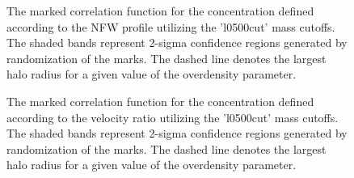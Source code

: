 \documentclass[usenatbib,usegraphicx,letterpaper]{mn2e}
\begin{document}
\begin{figure}
	\centering
	\caption{The marked correlation function for the concentration defined according to the NFW profile utilizing the 'l0500cut' mass cutoffs. The shaded bands represent 2-sigma confidence regions generated by randomization of the marks. The dashed line denotes the largest halo radius for a given value of the overdensity parameter.}
\end{figure}

\begin{figure}
	\centering
	\caption{The marked correlation function for the concentration defined according to the velocity ratio utilizing the 'l0500cut' mass cutoffs. The shaded bands represent 2-sigma confidence regions generated by randomization of the marks. The dashed line denotes the largest halo radius for a given value of the overdensity parameter.}
\end{figure}
\end{document}
